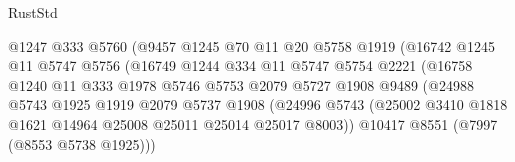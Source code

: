 \begin{lexlean}{RustStd}
\begin{coremodule}
                                  @1247
                                  @333
                                  @5760
                                  (@9457
                                    @1245
                                    @70
                                    @11
                                    @20
                                    @5758
                                    @1919
                                    (@16742
                                      @1245
                                      @11
                                      @5747
                                      @5756
                                      (@16749
                                        @1244
                                        @334
                                        @11
                                        @5747
                                        @5754
                                        @2221
                                        (@16758
                                          @1240
                                          @11
                                          @333
                                          @1978
                                          @5746
                                          @5753
                                          @2079
                                          @5727
                                          @1908
                                          @9489
                                          (@24988
                                            @5743
                                            @1925
                                            @1919
                                            @2079
                                            @5737
                                            @1908
                                            (@24996
                                              @5743
                                              (@25002
                                                @3410
                                                @1818
                                                @1621
                                                @14964
                                                @25008
                                                @25011
                                                @25014
                                                @25017
                                                @8003))
                                            @10417
                                            @8551
                                            (@7997 (@8553 @5738 @1925)))

\end{coremodule}
\end{lexlean}
